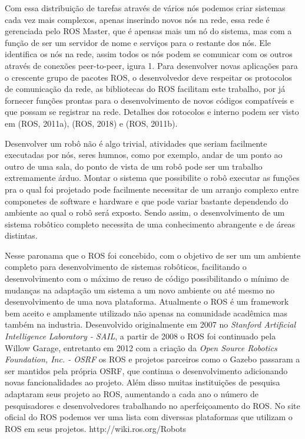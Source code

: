 Com essa distribuição de tarefas através de vários nós podemos criar sistemas cada vez mais complexos, apenas inserindo novos nós na rede, essa rede é gerenciada pelo ROS Master, que é apensas mais um nó do sistema, mas com a função de ser um servidor de nome e serviços para o restante dos nós. Ele identifica os nós na rede, assim todos os nós podem se comunicar com os outros através de conexões peer-to-peer, igura 1. Para desenvolver novas aplicações para o crescente grupo de pacotes ROS, o desenvolvedor deve respeitar os protocolos de comunicação da rede, as bibliotecas do ROS facilitam este trabalho, por já fornecer funções prontas para o desenvolvimento de novos códigos compatíveis e que possam se registrar na rede. Detalhes dos  rotocolos e interno podem ser visto em (ROS, 2011a), (ROS, 2018) e (ROS, 2011b).


Desenvolver um robô não é algo trivial, atividades que seriam facilmente executadas por nós, seres humnos, como por exemplo, andar de um ponto ao outro de uma sala, do ponto de vista de um robô pode ser um trabalho extremamente árduo. Montar o sistema que possibilite o robô executar as funções pra o qual foi projetado pode facilmente necessitar de um arranjo complexo entre componetes de software e hardware e que pode variar bastante dependendo do ambiente ao qual o robô será exposto. Sendo assim, o desenvolvimento de um sistema robôtico completo necessita de uma conhecimento abrangente e de áreas distintas.  

Nesse paronama que o ROS foi concebido, com o objetivo de  ser um um ambiente completo para desenvolvimento de sistemas robôticos, facilitando o desenvolvimento com o máximo de reuso de código possibilitando o mínimo de mudanças na adaptação um sistema a um novo ambiente ou até mesmo no desenvolvimento de uma nova plataforma. Atualmente o ROS é um framework bem aceito e amplamente utilizado não apenas na comunidade acadêmica mas também na industria. Desenvolvido originalmente em 2007 no \textit{Stanford Artificial Intelligence Laboratory - SAIL}, a partir de 2008 o ROS foi continuado pela Willow Garage, entretanto em 2012 com a criação da \textit{Open Source Robotics Foundation, Inc. - OSRF} os ROS e projetos parceiros como o Gazebo passaram a ser mantidos pela própria OSRF, que continua o desenvolvimento adicionando novas fancionalidades ao projeto. Além disso muitas instituições de pesquisa adaptaram seus projeto ao ROS, aumentando a cada ano o número de pesquisadores e desenvolvedores trabalhando no aperfeiçoamento do ROS. No site oficial do ROS podemos ver uma lista com diverssas plataformas que utilizam o ROS em seus projetos. http://wiki.ros.org/Robots

